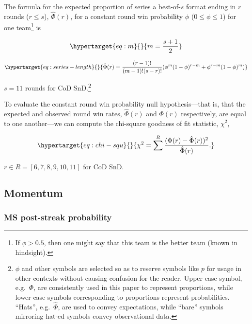 \documentclass{article}
\begin{document}
The formula for the expected proportion of series a best-of-\(s\) format
ending in \(r\) rounds (\(r \leq s\)), \(\hat{\Phi}(r)\), for a constant
round win probability \(\phi\) (\(0 \leq \phi \leq 1\)) for one
team\footnote{If \(\phi > 0.5\), then one might say that this team is
  the better team (known in hindsight).} is

\begin{equation}\protect\hypertarget{eq:m}{}{
m = \frac{s + 1}{2}
}\label{eq:m}\end{equation}

\begin{equation}\protect\hypertarget{eq:series-length}{}{
\hat{\Phi}(r) = \frac{(r - 1)!}{(m - 1)!(s - r)!}(\phi^{m}(1 - \phi)^{r - m} + \phi^{r - m}(1 - \phi)^m)
}\label{eq:series-length}\end{equation}

\(s = 11\) rounds for CoD SnD.\footnote{\(\phi\) and other symbols are
  selected so as to reserve symbols like \(p\) for usage in other
  contexts without causing confusion for the reader. Upper-case symbol,
  e.g.~\(\Phi\), are consistently used in this paper to represent
  proportions, while lower-case symbols corresponding to proportions
  represent probabilities. ``Hats'', e.g.~\(\hat{\Phi}\), are used to
  convey expectations, while ``bare'' symbols mirroring hat-ed symbols
  convey observational data.}

To evaluate the constant round win probability null hypothesis---that
is, that the expected and observed round win rates, \(\hat{\Phi}(r)\)
and \(\Phi(r)\) respectively, are equal to one another---we can compute
the chi-square goodness of fit statistic, \(\chi^2\),

\begin{equation}\protect\hypertarget{eq:chi-squ}{}{
\chi^2 = \sum^R \frac{(\Phi(r) - \hat{\Phi}(r))^2}{\hat{\Phi}(r)}.
}\label{eq:chi-squ}\end{equation}

\(r \in R = [6, 7, 8, 9, 10, 11]\) for CoD SnD.

\hypertarget{momentum}{%
\subsection{Momentum}\label{momentum}}

\hypertarget{ms-post-streak-probability}{%
\subsubsection{MS post-streak
probability}\label{ms-post-streak-probability}}
\end{document}
